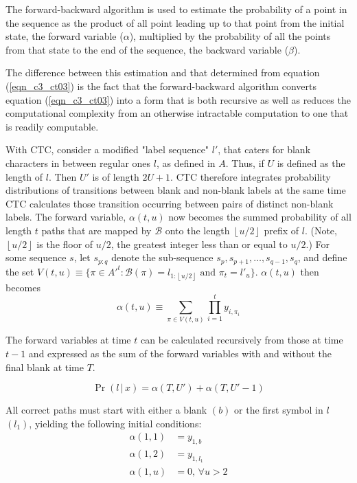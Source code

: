 The forward-backward algorithm is used to estimate the probability of a point in the sequence as the product of all point leading up to that point from the  initial state, the forward variable ($\alpha$), multiplied by the probability of all the points from that state to the end of the sequence, the backward variable ($\beta$).

The difference between this estimation and that determined from equation (\ref{eqn_c3_ct03}) is the fact that the forward-backward algorithm converts equation (\ref{eqn_c3_ct03}) into a form that is both recursive as well as reduces the computational complexity from an otherwise intractable computation to one that is readily computable.

With CTC, consider a modified "label sequence" $l'$, that caters for blank characters in between regular ones $l$, as defined in $A$. Thus, if $U$ is defined as the length of $l$.  Then $U'$ is of length $2U + 1$. CTC therefore integrates probability distributions of transitions between blank and non-blank labels at the same time CTC calculates those transition occurring between pairs of distinct non-blank labels.  The forward variable, $\alpha(t,u)$ now becomes the summed probability of all length $t$ paths that are mapped by $\mathcal{B}$ onto the length $\left \lfloor{u/2}\right \rfloor$ prefix of $l$. (Note, $\left \lfloor{u/2}\right \rfloor$ is the floor of $u/2$, the greatest integer less than or equal to $u/2$.) For some sequence $s$, let $s_{p:q}$ denote the sub-sequence $s_p, s_{p+1},\dots,s_{q-1},s_q$, and define the set $V(t,u) \equiv \{ \pi \in A'^t : \mathcal{B}(\pi) = l_{1:\left \lfloor{u/2}\right \rfloor} \text{ and } \pi_t = l'_u \}$.  $\alpha(t,u)$ then becomes
\begin{equation}
\alpha(t,u) \equiv \sum_{\pi \in V(t,u)} \prod_{i=1}^{t} y_{i,\pi_i} 
\label{eqn_c3_ctc04}
\end{equation}

The forward variables at time $t$ can be calculated recursively from those at time $t - 1$ and expressed as the sum of the forward variables with and without the final blank at time $T$.

\begin{equation}
\Pr( l \, | \, x) = \alpha(T, U') + \alpha(T, U' - 1)
\label{eqn_c3_ctc05}
\end{equation}

All correct paths must start with either a blank $(b)$ or the first symbol in $l$ $(l_1)$, yielding the following initial conditions:
\begin{equation}
\begin{aligned}\alpha(1, 1) &= y_{1,b} \\ \alpha(1, 2) &= y_{1,l_1} \\ \alpha(1, u) &= 0, \, \forall u > 2 \end{aligned}
\label{eqn_c3_ctc05}\end{equation}

